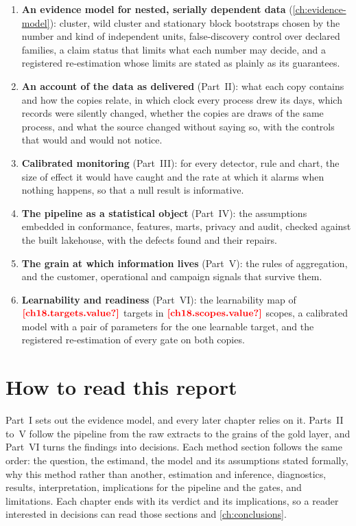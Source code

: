 \begin{enumerate}
  \item \textbf{An evidence model for nested, serially dependent data} (\cref{ch:evidence-model}): cluster, wild cluster
  and stationary block bootstraps chosen by the number and kind of independent units, false-discovery control over
  declared families, a claim status that limits what each number may decide, and a registered re-estimation whose
  limits are stated as plainly as its guarantees.
  \item \textbf{An account of the data as delivered} (Part~II): what each copy contains and how the copies relate, in
  which clock every process drew its days, which records were silently changed, whether the copies are draws of the
  same process, and what the source changed without saying so, with the controls that would and would not notice.
  \item \textbf{Calibrated monitoring} (Part~III): for every detector, rule and chart, the size of effect it would have
  caught and the rate at which it alarms when nothing happens, so that a null result is informative.
  \item \textbf{The pipeline as a statistical object} (Part~IV): the assumptions embedded in conformance, features,
  marts, privacy and audit, checked against the built lakehouse, with the defects found and their repairs.
  \item \textbf{The grain at which information lives} (Part~V): the rules of aggregation, and the customer, operational
  and campaign signals that survive them.
  \item \textbf{Learnability and readiness} (Part~VI): the learnability map of $\est{ch18.targets}{value}$ targets in
  $\est{ch18.scopes}{value}$ scopes, a calibrated model with a pair of parameters for the one learnable target, and
  the registered re-estimation of every gate on both copies.
\end{enumerate}

\section{How to read this report}\label{sec:intro-reading}

Part~I sets out the evidence model, and every later chapter relies on it. Parts~II to~V follow the pipeline from the
raw extracts to the grains of the gold layer, and Part~VI turns the findings into decisions. Each method section follows
the same order: the question, the estimand, the model and its assumptions stated formally, why this method rather than
another, estimation and inference, diagnostics, results, interpretation, implications for the pipeline and the gates,
and limitations. Each chapter ends with its verdict and its implications, so a reader interested in decisions can read
those sections and \cref{ch:conclusions}.

